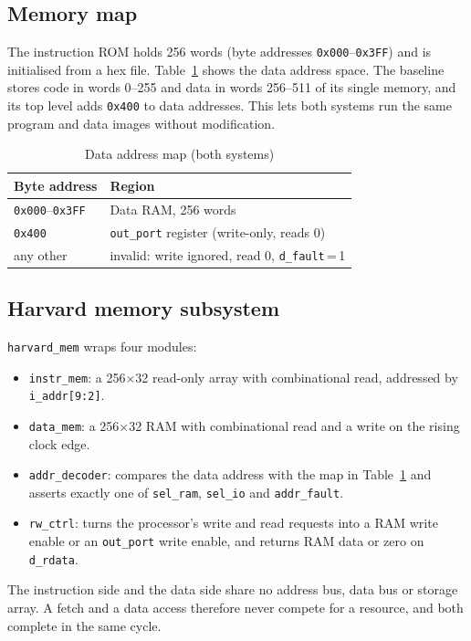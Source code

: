 \documentclass[conference]{IEEEtran}
\newcommand{\sig}[1]{\texttt{#1}}
\begin{document}
\subsection{Memory map}
The instruction ROM holds 256 words (byte addresses \texttt{0x000}--\texttt{0x3FF}) and is
initialised from a hex file. Table~\ref{tab:map} shows the data address space. The baseline
stores code in words 0--255 and data in words 256--511 of its single memory, and its top level
adds \texttt{0x400} to data addresses. This lets both systems run the same program and data
images without modification.

\begin{table}[t]
  \caption{Data address map (both systems)}
  \label{tab:map}
  \centering
  \begin{tabular}{@{}ll@{}}
    \toprule
    Byte address & Region \\
    \midrule
    \texttt{0x000}--\texttt{0x3FF} & Data RAM, 256 words \\
    \texttt{0x400} & \sig{out\_port} register (write-only, reads 0) \\
    any other & invalid: write ignored, read 0, \sig{d\_fault}\,=\,1 \\
    \bottomrule
  \end{tabular}
\end{table}

\subsection{Harvard memory subsystem}
\sig{harvard\_mem} wraps four modules:
\begin{itemize}
  \item \sig{instr\_mem}: a 256$\times$32 read-only array with combinational read, addressed by
        \sig{i\_addr[9:2]}.
  \item \sig{data\_mem}: a 256$\times$32 RAM with combinational read and a write on the rising
        clock edge.
  \item \sig{addr\_decoder}: compares the data address with the map in Table~\ref{tab:map} and
        asserts exactly one of \sig{sel\_ram}, \sig{sel\_io} and \sig{addr\_fault}.
  \item \sig{rw\_ctrl}: turns the processor's write and read requests into a RAM write enable
        or an \sig{out\_port} write enable, and returns RAM data or zero on \sig{d\_rdata}.
\end{itemize}
The instruction side and the data side share no address bus, data bus or storage array. A fetch
and a data access therefore never compete for a resource, and both complete in the same cycle.
\end{document}
